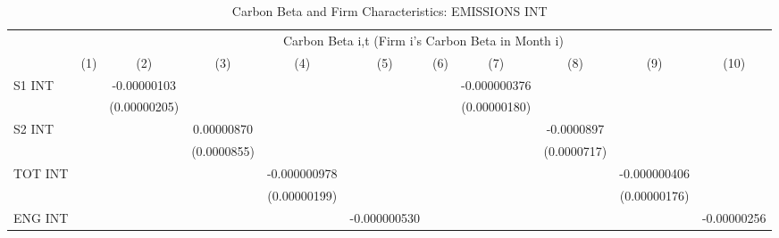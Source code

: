 \begin{table}[htbp]\centering
\def\sym#1{\ifmmode^{#1}\else\(^{#1}\)\fi}
\caption{Carbon Beta and Firm Characteristics: EMISSIONS INT}
\begin{tabular}{l*{10}{c}}
\hline\hline
                &\multicolumn{10}{c}{Carbon Beta i,t (Firm i's Carbon Beta in Month i)}                                                                                                                       \\\cmidrule(lr){2-11}
                &\multicolumn{1}{c}{(1)}         &\multicolumn{1}{c}{(2)}         &\multicolumn{1}{c}{(3)}         &\multicolumn{1}{c}{(4)}         &\multicolumn{1}{c}{(5)}         &\multicolumn{1}{c}{(6)}         &\multicolumn{1}{c}{(7)}         &\multicolumn{1}{c}{(8)}         &\multicolumn{1}{c}{(9)}         &\multicolumn{1}{c}{(10)}         \\
\hline
S1 INT          &                  &-0.00000103         &                  &                  &                  &                  &-0.000000376         &                  &                  &                  \\
                &                  &(0.00000205)         &                  &                  &                  &                  &(0.00000180)         &                  &                  &                  \\
S2 INT          &                  &                  &0.00000870         &                  &                  &                  &                  &-0.0000897         &                  &                  \\
                &                  &                  &(0.0000855)         &                  &                  &                  &                  &(0.0000717)         &                  &                  \\
TOT INT         &                  &                  &                  &-0.000000978         &                  &                  &                  &                  &-0.000000406         &                  \\
                &                  &                  &                  &(0.00000199)         &                  &                  &                  &                  &(0.00000176)         &                  \\
ENG INT         &                  &                  &                  &                  &-0.000000530         &                  &                  &                  &                  &-0.00000256         \\

\end{tabular}
\end{table}
